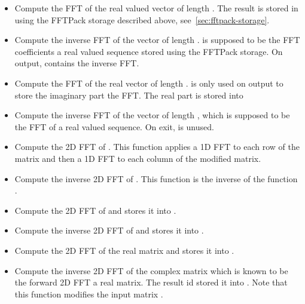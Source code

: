 \begin{itemize}
\item {}
  \sshortdescribe Compute the FFT of the real valued vector  of
  length . The result is stored in  using the FFTPack storage
  described above, see~\ref{sec:fftpack-storage}.

\item {}
  \sshortdescribe Compute the inverse FFT of the vector  of length
  .  is supposed to be the FFT coefficients a real valued
  sequence stored using the FFTPack storage. On output,  contains
  the inverse FFT.

\item {}
  \sshortdescribe Compute the FFT of the real vector  of length .
   is only used on output to store the imaginary part the FFT. The
  real part is stored into 

\item {}
  \sshortdescribe Compute the inverse FFT of the vector  of
  length , which is supposed to be the FFT of a real valued
  sequence. On exit,  is unused.
\item {}
  \sshortdescribe Compute the 2D FFT of . This function applies a 1D
  FFT to each row of the matrix and then a 1D FFT to each column of the modified
  matrix.
\item {}
  \sshortdescribe Compute the inverse 2D FFT of . This function is
  the inverse of the function .
\item {}
  \sshortdescribe Compute the 2D FFT of  and stores it into .
\item {}
  \sshortdescribe Compute the inverse 2D FFT of  and stores it into .
\item {}
  \sshortdescribe Compute the 2D FFT of the real matrix  and stores it into .
\item {}
  \sshortdescribe Compute the inverse 2D FFT of the complex matrix 
  which is known to be the forward 2D FFT a real matrix. The result id stored it
  into . Note that this function modifies the input matrix .
\end{itemize}


